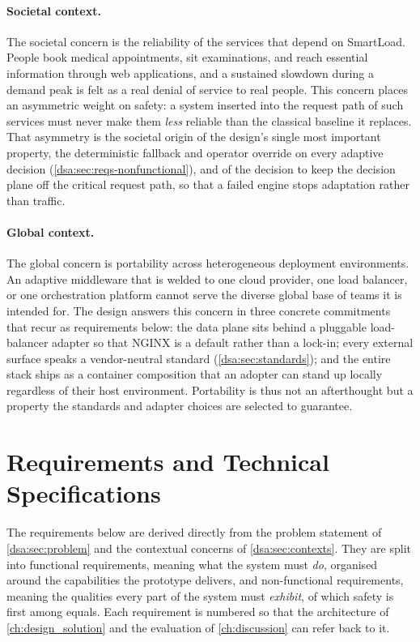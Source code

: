 \paragraph{Societal context.}
The societal concern is the reliability of the services that depend on SmartLoad.
People book medical appointments, sit examinations, and reach essential information
through web applications, and a sustained slowdown during a demand peak is felt as a
real denial of service to real people. This concern places an asymmetric weight on
safety: a system inserted into the request path of such services must never make
them \emph{less} reliable than the classical baseline it replaces. That asymmetry is
the societal origin of the design's single most important property, the
deterministic fallback and operator override on every adaptive decision
(\cref{dsa:sec:reqs-nonfunctional}), and of the decision to keep the decision
plane off the critical request path, so that a failed engine stops adaptation rather
than traffic.

\paragraph{Global context.}
The global concern is portability across heterogeneous deployment environments. An
adaptive middleware that is welded to one cloud provider, one load balancer, or one
orchestration platform cannot serve the diverse global base of teams it is intended
for. The design answers this concern in three concrete commitments that recur as
requirements below: the data plane sits behind a pluggable load-balancer adapter so
that NGINX is a default rather than a lock-in; every external surface speaks a
vendor-neutral standard (\cref{dsa:sec:standards}); and the entire stack ships as a
container composition that an adopter can stand up locally regardless of their host
environment. Portability is thus not an afterthought but a property the standards and
adapter choices are selected to guarantee.

\section{Requirements and Technical Specifications}
\label{dsa:sec:reqs}

The requirements below are derived directly from the problem statement of
\cref{dsa:sec:problem} and the contextual concerns of \cref{dsa:sec:contexts}. They
are split into functional requirements, meaning what the system must \emph{do},
organised around the capabilities the prototype delivers, and non-functional
requirements, meaning the qualities every part of the system must \emph{exhibit}, of
which safety is first among equals. Each requirement is numbered so that the architecture of
\cref{ch:design_solution} and the evaluation of \cref{ch:discussion} can refer back
to it.

